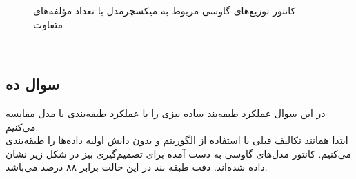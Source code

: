 \documentclass[12pt,onecolumn,a4paper]{article}
\begin{document}
\begin{figure}[h]
    \centering
    \caption{کانتور توزیع‌های گاوسی مربوط به میکسچرمدل با تعداد مؤلفه‌های متفاوت}
    \label{fig:6}
\end{figure}

\newpage
~\newpage
\subsection{سوال ده}
در این سوال عملکرد طبقه‌بند ساده بیزی را با عملکرد طبقه‌بندی با مدل  مقایسه می‌کنیم.
\\
ابتدا همانند تکالیف قبلی با استفاده از الگوریتم  و بدون دانش اولیه  داده‌ها را طبقه‌بندی می‌کنیم. کانتور مدل‌های گاوسی به دست آمده برای تصمیم‌گیری بیز در شکل زیر نشان داده شده‌اند. دقت طبقه بند در این حالت برابر ۸۸ درصد می‌باشد.
\end{document}
